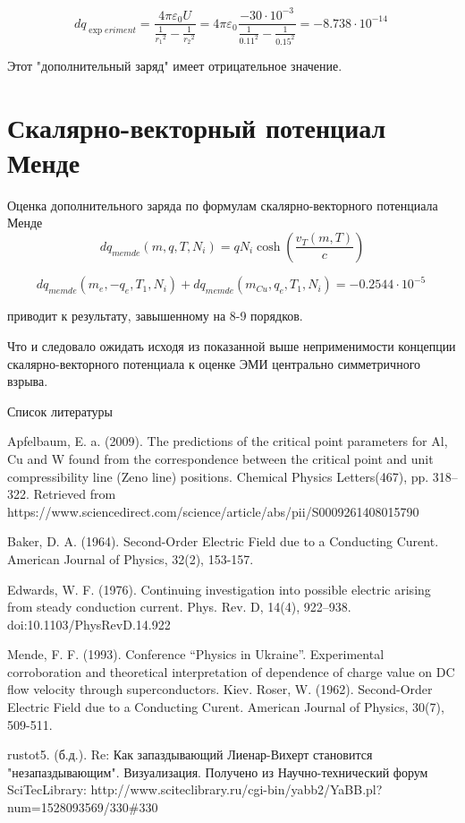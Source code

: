 ﻿\documentclass[12pt, letterpaper]{article}
\begin{document}
$$d{{q}_{\exp eriment}}=\frac{4\pi {{\varepsilon }_{0}}U}{\frac{1}{{{r}_{1}}^{2}}-\frac{1}{{{r}_{2}}^{2}}}=4\pi {{\varepsilon }_{0}}\frac{-30\cdot {{10}^{-3}}}{\frac{1}{{{0.11}^{2}}}-\frac{1}{{{0.15}^{2}}}}=-8.738\cdot {{10}^{-14}}\ $$

Этот "дополнительный заряд" имеет отрицательное значение.


\section{Скалярно-векторный потенциал Менде}

Оценка дополнительного заряда по формулам скалярно-векторного потенциала Менде
$$d{{q}_{memde}}(m,q,T,{{N}_{i}})=q{{N}_{i}}\cosh \left( \frac{{{v}_{T}}\left( m,T \right)}{c} \right)$$

$$d{{q}_{memde}}({{m}_{e}},-{{q}_{e}},{{T}_{1}},{{N}_{i}})+d{{q}_{memde}}({{m}_{Cu}},{{q}_{e}},{{T}_{1}},{{N}_{i}})=-0.2544\cdot {{10}^{-5}}\ $$

приводит к результату, завышенному на 8-9 порядков. 

Что и следовало ожидать исходя из показанной выше неприменимости концепции скалярно-векторного потенциала к оценке ЭМИ центрально симметричного взрыва.



Список литературы

Apfelbaum, E. a. (2009). The predictions of the critical point parameters for Al, Cu and W found from the correspondence between the critical point and unit compressibility line (Zeno line) positions. Chemical Physics Letters(467), pp. 318–322. Retrieved from https://www.sciencedirect.com/science/article/abs/pii/S0009261408015790 

Baker, D. A. (1964). Second-Order Electric Field due to a Conducting Curent. American Journal of Physics, 32(2), 153-157.

Edwards, W. F. (1976). Continuing investigation into possible electric arising from steady conduction current. Phys. Rev. D, 14(4), 922--938. doi:10.1103/PhysRevD.14.922

Mende, F. F. (1993). Conference “Physics in Ukraine”. Experimental corroboration and theoretical interpretation of dependence of charge value on DC flow velocity through superconductors. Kiev.
Roser, W. (1962). Second-Order Electric Field due to a Conducting Curent. American Journal of Physics, 30(7), 509-511.

rustot5. (б.д.). Re: Как запаздывающий Лиенар-Вихерт становится "незапаздывающим". Визуализация. Получено из Научно-технический форум SciTecLibrary: http://www.sciteclibrary.ru/cgi-bin/yabb2/YaBB.pl?num=1528093569/330\#330
\end{document}
